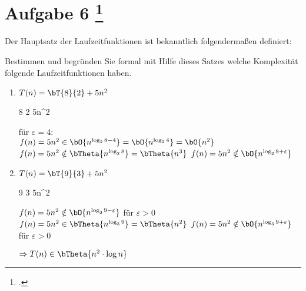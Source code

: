 \documentclass{bschlangaul-aufgabe}
\begin{document}
\let\O=\bO
\let\o=\bOmega
\let\T=\bT
\let\t=\bTheta

\section{Aufgabe 6
\footcite{examen:66115:2019:09}}

Der Hauptsatz der Laufzeitfunktionen ist bekanntlich folgendermaßen
definiert:

\bMasterFaelle

\noindent
Bestimmen und begründen Sie formal mit Hilfe dieses Satzes welche
Komplexität folgende Laufzeitfunktionen haben.

\begin{enumerate}


\item $T(n) = \T{8}{2} + 5n^2$

\begin{bAntwort}
\bMasterVariablenDeklaration
{8} %
{2} %
{5n^2} %

\bMasterFallRechnung
{für $\varepsilon = 4$: \\
$f(n) = 5n^2 \in \O{n^{\log_2 {8 - 4}}} = \O{n^{\log_2 4}} = \O{n^2}$}
{$f(n) = 5n^2 \notin \t{n^{\log_2 {8}}} = \t{n^3}$}
{$f(n) = 5n^2 \notin \O{n^{\log_2 {8 + \varepsilon}}}$}

\end{bAntwort}


\item $T(n) = \T{9}{3} + 5n^2$

\begin{bAntwort}
\bMasterVariablenDeklaration
{9} %
{3} %
{5n^2} %

\bMasterFallRechnung
{$f(n) = 5n^2 \notin \O{n^{\log_3 {9 - \varepsilon}}}$ für $\varepsilon > 0$}
{$f(n) = 5n^2 \in \t{n^{\log_3 {9}}} = \t{n^2}$}
{$f(n) = 5n^2 \notin \O{n^{\log_3 {9 + \varepsilon}}}$ für $\varepsilon > 0$}

$\Rightarrow T(n) \in \t{n^2 \cdot \log n}$

\end{bAntwort}

\end{enumerate}
\end{document}
